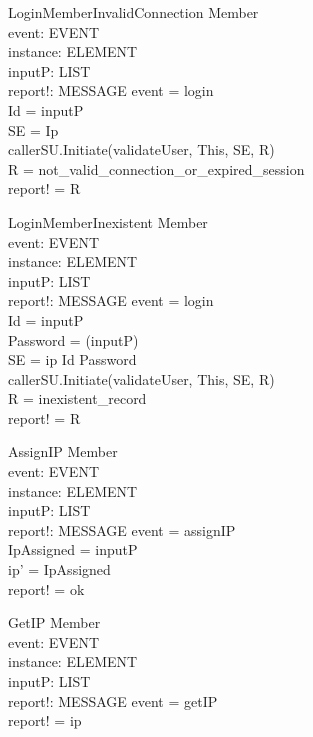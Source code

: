 \begin{schema}{LoginMemberInvalidConnection}
\Delta Member \\
event: EVENT \\
instance: ELEMENT \\
inputP: LIST \\
report!: MESSAGE
\where event = login \\
Id = \head inputP \\
SE = \lseq Ip \rseq \\
callerSU.Initiate(validateUser, This, SE, R) \\
R = not\_valid\_connection\_or\_expired\_session \\ 
report! = R
\end{schema}

\begin{schema}{LoginMemberInexistent}
\Delta Member \\
event: EVENT \\
instance: ELEMENT \\
inputP: LIST \\
report!: MESSAGE
\where event = login \\
Id = \head inputP \\
Password = \head (\tail inputP) \\
SE = \lseq ip Id Password  \rseq \\
callerSU.Initiate(validateUser, This, SE, R)\\
R = inexistent\_record \\
report! = R 
\end{schema}

\begin{schema}{AssignIP}
\Delta Member \\
event: EVENT \\
instance: ELEMENT \\
inputP: LIST \\
report!: MESSAGE
\where event = assignIP \\
IpAssigned = \head inputP \\
ip' = IpAssigned \\
report! = ok 
\end{schema}

\begin{schema}{GetIP}
\Delta Member \\ 
event: EVENT \\
instance: ELEMENT \\
inputP: LIST \\
report!: MESSAGE
\where event = getIP \\
report! = ip 
\end{schema}

